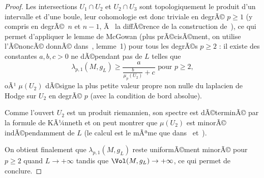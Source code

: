 \documentclass[11pt,a4paper]{smfart}
\begin{document}
\begin{proof}
Les intersections $U_1\cap U_2$ et $U_2\cap U_3$ sont topologiquement 
le produit d'un intervalle et d'une boule, leur cohomologie est donc
triviale en degrÃ© $p\geq1$ (y compris en degrÃ©~$n$ et $n-1$, Ã  la 
diffÃ©rence de la construction de~\cite{ces06}), ce qui permet d'appliquer 
le lemme de McGowan \cite{mc93} (plus prÃ©cisÃ©ment, on utilise l'Ã©noncÃ©
donnÃ© dans~\cite{gp95}, lemme~1) pour tous les degrÃ©s $p\geq2$ : 
il existe des constantes $a,b,c>0$ ne dÃ©pendant pas de $L$ telles que 
\begin{equation}
\lambda_{p,1}(M,g_L)\geq\frac a{\frac b{\mu_p(U_2)}+c}\textrm{ pour }p\geq2,
\end{equation}
oÃ¹ $\mu(U_2)$ dÃ©signe la plus petite valeur propre non nulle du laplacien
de Hodge sur $U_2$ en degrÃ© $p$ (avec la condition de bord absolue).

Comme l'ouvert $U_2$ est un produit riemannien, son spectre est dÃ©terminÃ©
par la formule de KÃ¼nneth et on peut montrer que $\mu(U_2)$ est minorÃ© 
indÃ©pendamment de $L$ (le calcul est le mÃªme que dans~\cite{gp95}
et~\cite{ces06}).

On obtient finalement que $\lambda_{p,1}(M,g_L)$ reste uniformÃ©ment
minorÃ© pour $p\geq2$ quand $L\to+\infty$ tandis que $\Vol(M,g_L)\to
+\infty$, ce qui permet de conclure.
\end{proof}
\end{document}

